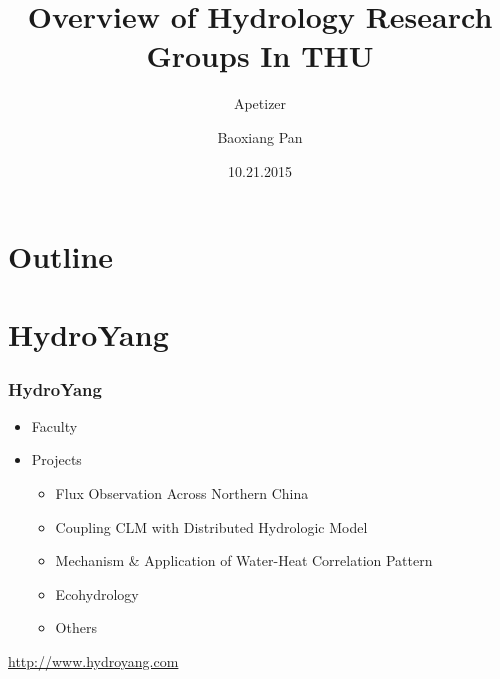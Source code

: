 \documentclass{beamer}
\title{Overview of Hydrology Research Groups In THU}
\subtitle{Apetizer}
\author{Baoxiang Pan}
\institute{Institute of Hydrology and Water Resources\\ \\Tsinghua University}
\date{\small{10.21.2015}}
\begin{document}
\begin{CJK}{UTF8}{gkai}
\frame{
\titlepage
}

\newcommand{\nologo}{}
{\nologo
  \section*{Outline}
  \frame {
    \frametitle{\secname}
    \tableofcontents
  }


  \section{HydroYang}
  \frame
  {
  \frametitle{HydroYang}
  \begin{itemize}
  \item Faculty
  \item Projects
    \begin{itemize}
    \item Flux Observation Across Northern China
    \item Coupling CLM with Distributed Hydrologic Model
    \item Mechanism \& Application of Water-Heat Correlation Pattern
    \item Ecohydrology 
    \item Others
    \end{itemize}
  \end{itemize}
  \url{http://www.hydroyang.com}
  }


}
\end{CJK}
\end{document}
